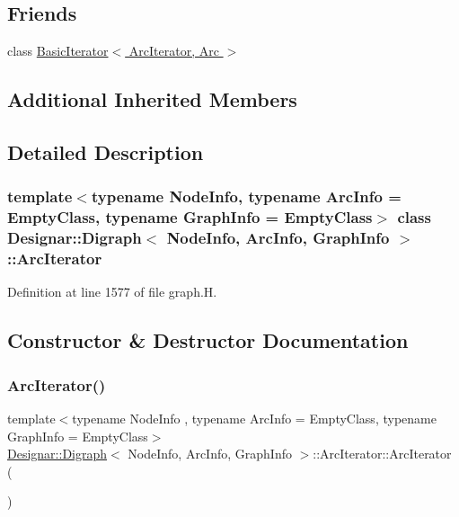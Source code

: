 \subsection*{Friends}
\begin{DoxyCompactItemize}
\item 
class \hyperlink{class_designar_1_1_digraph_1_1_arc_iterator_a530ad7c7218fa9b74a5cce004d0e3a1c}{Basic\+Iterator$<$ Arc\+Iterator, Arc $>$}
\end{DoxyCompactItemize}
\subsection*{Additional Inherited Members}


\subsection{Detailed Description}
\subsubsection*{template$<$typename Node\+Info, typename Arc\+Info = Empty\+Class, typename Graph\+Info = Empty\+Class$>$\newline
class Designar\+::\+Digraph$<$ Node\+Info, Arc\+Info, Graph\+Info $>$\+::\+Arc\+Iterator}



Definition at line 1577 of file graph.\+H.



\subsection{Constructor \& Destructor Documentation}
\mbox{\label{class_designar_1_1_digraph_1_1_arc_iterator_a0f540c556301e1d4e0a9d48433257b89}} 
\subsubsection{\texorpdfstring{Arc\+Iterator()}{ArcIterator()}\hspace{0.1cm}{\footnotesize\ttfamily [1/5]}}
{\footnotesize\ttfamily template$<$typename Node\+Info , typename Arc\+Info  = Empty\+Class, typename Graph\+Info  = Empty\+Class$>$ \\
\hyperlink{class_designar_1_1_digraph}{Designar\+::\+Digraph}$<$ Node\+Info, Arc\+Info, Graph\+Info $>$\+::Arc\+Iterator\+::\+Arc\+Iterator (\begin{DoxyParamCaption}{ }\end{DoxyParamCaption})\hspace{0.3cm}{\ttfamily [inline]}}



